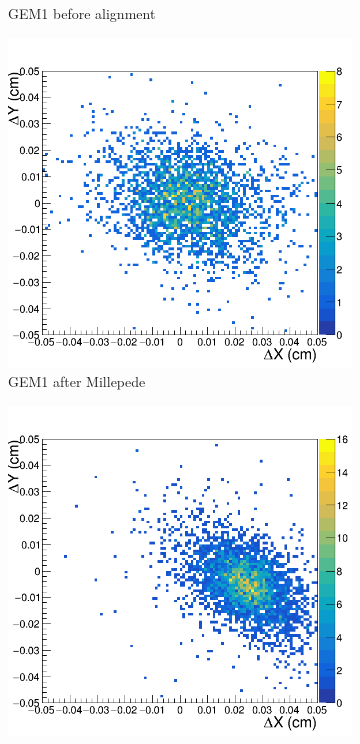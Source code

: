 \begin{figure}[h!]
\begin{subfigure}[l]{.45\textwidth}
   \caption{GEM1 before alignment}
   \label{fig:GEM1_before}
 \end{subfigure}
 \begin{subfigure}[r]{.45\textwidth}
   \centering
   \includegraphics[width=\linewidth]{thesis_figures/alignment/Run_3211_after_millepede/square/GEM1.png}
   \caption{GEM1 after Millepede}
   \label{fig:GEM1_after}
 \end{subfigure}
 \hfill
 \begin{subfigure}[l]{.45\textwidth}
   \centering
   \includegraphics[width=\linewidth]{thesis_figures/alignment/Run_3211_before/square/GEM2.png}

\end{subfigure}
\end{figure}
